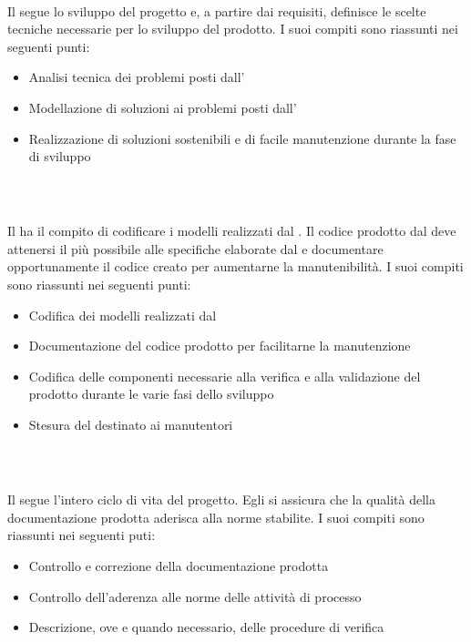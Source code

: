 \subparagraph{\prog{}}\mbox{}\\
\mbox{}\\
Il \prog{} segue lo sviluppo del progetto e, a partire dai requisiti, definisce le scelte tecniche necessarie per lo sviluppo del prodotto. 
I suoi compiti sono riassunti nei seguenti punti:
\begin{itemize}
\item Analisi tecnica dei problemi posti dall' \ana{}
\item Modellazione di soluzioni ai problemi posti dall' \ana{}
\item Realizzazione di soluzioni sostenibili e di facile manutenzione durante la fase di sviluppo
\end{itemize}

\subparagraph{\progr{}}\mbox{}\\
\mbox{}\\
Il \progr{} ha il compito di codificare i modelli realizzati dal \prog{}. Il codice prodotto dal \progr{} deve attenersi il più possibile alle specifiche elaborate dal \prog{} e documentare opportunamente il codice creato per aumentarne la manutenibilità.
I suoi compiti sono riassunti nei seguenti punti:
\begin{itemize}
\item Codifica dei modelli realizzati dal \prog{}
\item Documentazione del codice prodotto per facilitarne la manutenzione
\item Codifica delle componenti necessarie alla verifica e alla validazione del prodotto durante le varie fasi dello sviluppo
\item Stesura del \MU{} destinato ai manutentori
\end{itemize}

\subparagraph{\ver{}}\mbox{}\\
\mbox{}\\
Il \ver{} segue l'intero ciclo di vita del progetto. Egli si assicura che la qualità della documentazione prodotta aderisca alla norme stabilite.
I suoi compiti sono riassunti nei seguenti puti:
\begin{itemize}
\item Controllo e correzione della documentazione prodotta
\item Controllo dell'aderenza alle norme delle attività di processo
\item Descrizione, ove e quando necessario, delle procedure di verifica
\end{itemize}

